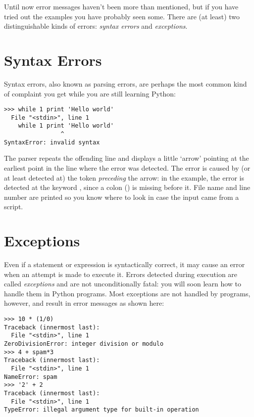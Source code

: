 \documentclass{manual}
\begin{document}
Until now error messages haven't been more than mentioned, but if you
have tried out the examples you have probably seen some.  There are
(at least) two distinguishable kinds of errors: \emph{syntax errors}
and \emph{exceptions}.

\section{Syntax Errors}
\label{syntaxErrors}

Syntax errors, also known as parsing errors, are perhaps the most common
kind of complaint you get while you are still learning Python:

\begin{verbatim}
>>> while 1 print 'Hello world'
  File "<stdin>", line 1
    while 1 print 'Hello world'
                ^
SyntaxError: invalid syntax
\end{verbatim}

The parser repeats the offending line and displays a little `arrow'
pointing at the earliest point in the line where the error was detected.
The error is caused by (or at least detected at) the token
\emph{preceding}
the arrow: in the example, the error is detected at the keyword
, since a colon (\character{:}) is missing before it.
File name and line number are printed so you know where to look in case
the input came from a script.

\section{Exceptions}
\label{exceptions}

Even if a statement or expression is syntactically correct, it may
cause an error when an attempt is made to execute it.
Errors detected during execution are called \emph{exceptions} and are
not unconditionally fatal: you will soon learn how to handle them in
Python programs.  Most exceptions are not handled by programs,
however, and result in error messages as shown here:

\begin{verbatim}
>>> 10 * (1/0)
Traceback (innermost last):
  File "<stdin>", line 1
ZeroDivisionError: integer division or modulo
>>> 4 + spam*3
Traceback (innermost last):
  File "<stdin>", line 1
NameError: spam
>>> '2' + 2
Traceback (innermost last):
  File "<stdin>", line 1
TypeError: illegal argument type for built-in operation
\end{verbatim}
\end{document}
